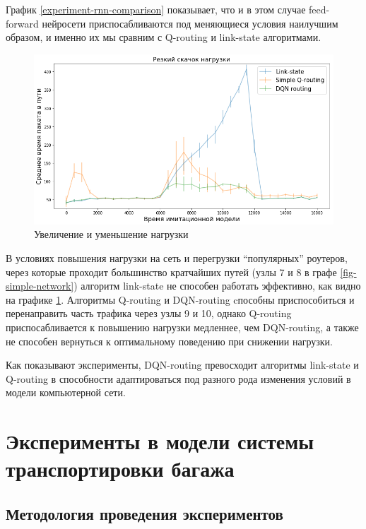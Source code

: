 \documentclass[specification, annotation]{itmo-student-thesis}
\begin{document}
График \ref{experiment-rnn-comparison} показывает, что и в этом случае
feed-forward нейросети приспосабливаются под меняющиеся условия наилучшим
образом, и именно их мы сравним с Q-routing и link-state алгоритмами.

\begin{figure}[!h]
  \caption{Увеличение и уменьшение нагрузки}\label{experiment-peak-load}
  \centering
  \includegraphics[scale=0.6]{experiment-peak-load}
\end{figure}

В условиях повышения нагрузки на сеть и перегрузки \enquote{популярных} роутеров,
через которые проходит большинство кратчайших путей (узлы 7 и 8 в графе
\ref{fig-simple-network}) алгоритм link-state не способен работать эффективно,
как видно на графике \ref{experiment-peak-load}. Алгоритмы Q-routing и
DQN-routing cпособны приспособиться и перенаправить часть трафика через узлы 9 и
10, однако Q-routing приспосабливается к повышению нагрузки медленнее, чем
DQN-routing, а также не способен вернуться к оптимальному поведению при снижении
нагрузки.

Как показывают эксперименты, DQN-routing превосходит алгоритмы link-state и
Q-routing в способности адаптироваться под разного рода изменения условий в
модели компьютерной сети.

\section{Эксперименты в модели системы транспортировки багажа}\label{experiments:conveyors}

\subsection{Методология проведения экспериментов}
\end{document}
